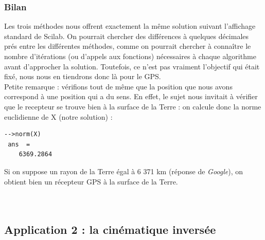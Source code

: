\documentclass[a4paper,10pt]{report}
\begin{document}
\subsubsection{Bilan}
Les trois méthodes nous offrent exactement la même solution suivant l'affichage standard de Scilab. On pourrait chercher des différences à quelques décimales prés entre les différentes méthodes, comme on pourrait chercher à connaître le nombre d'itérations (ou d'appels aux fonctions) nécessaires à chaque algorithme avant d'approcher la solution. Toutefois, ce n'est pas vraiment l'objectif qui était fixé, nous nous en tiendrons donc là pour le GPS.\\
Petite remarque : vérifions tout de même que la position que nous avons correspond à une position qui a du sens. En effet, le sujet nous invitait à vérifier que le recepteur se trouve bien à la surface de la Terre : on calcule donc la norme euclidienne de X (notre solution) :
\begin{verbatim}
-->norm(X)
 ans  =
    6369.2864  
\end{verbatim}
Si on suppose un rayon de la Terre égal à 6 371 km (réponse de \textit{Google}), on obtient bien un récepteur GPS à la surface de la Terre.
\\ \\ \\

\subsection{Application 2 : la cinématique inversée}
\end{document}
